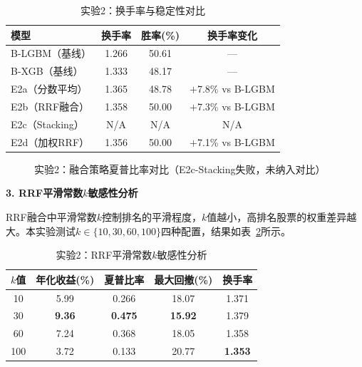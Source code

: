 \documentclass[11pt,a4paper]{ctexart}
\newcommand{\best}[1]{\textcolor{bestval}{\textbf{#1}}}
\begin{document}
\begin{table}[htbp]
\centering
\caption{实验2：换手率与稳定性对比}
\label{tab:exp2-stability}
\begin{tabular}{lccc}
\toprule
\textbf{模型} & \textbf{换手率} & \textbf{胜率(\%)} & \textbf{换手率变化} \\
\midrule
B-LGBM（基线） & 1.266 & 50.61 & --- \\
B-XGB（基线）  & 1.333 & 48.17 & --- \\
E2a（分数平均） & 1.365 & 48.78 & $+$7.8\% vs B-LGBM \\
E2b（RRF融合） & 1.358 & 50.00 & $+$7.3\% vs B-LGBM \\
E2c（Stacking） & N/A & N/A & N/A \\
E2d（加权RRF） & 1.356 & 50.00 & $+$7.1\% vs B-LGBM \\
\bottomrule
\end{tabular}
\end{table}

\begin{figure}[htbp]
\centering
{}
\caption{实验2：融合策略夏普比率对比（E2c-Stacking失败，未纳入对比）}
\label{fig:exp2-sharpe}
\end{figure}

\textbf{3. RRF平滑常数$k$敏感性分析}

RRF融合中平滑常数$k$控制排名的平滑程度，$k$值越小，高排名股票的权重差异越大。本实验测试$k \in \{10, 30, 60, 100\}$四种配置，结果如表~\ref{tab:exp2-sensitivity}所示。

\begin{table}[htbp]
\centering
\caption{实验2：RRF平滑常数$k$敏感性分析}
\label{tab:exp2-sensitivity}
\begin{tabular}{ccccc}
\toprule
\textbf{$k$值} & \textbf{年化收益(\%)} & \textbf{夏普比率} & \textbf{最大回撤(\%)} & \textbf{换手率} \\
\midrule
10  & 5.99 & 0.266 & 18.07 & 1.371 \\
30  & \best{9.36} & \best{0.475} & \best{15.92} & 1.379 \\
60  & 7.24 & 0.368 & 18.05 & 1.358 \\
100 & 3.72 & 0.133 & 20.77 & \best{1.353} \\
\bottomrule
\end{tabular}
\end{table}
\end{document}
